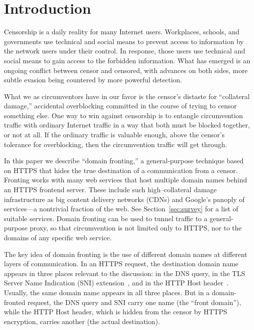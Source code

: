 \documentclass[conference]{IEEEtran}
\begin{document}
\section{Introduction}


Censorship is a daily reality for many Internet users.
Workplaces, schools, and governments use technical and social means
to prevent access to information by the network users under their control.
In response, those users use technical and social means
to gain access to the forbidden information.
What has emerged is an ongoing conflict between censor and censored,
with advances on both sides, more subtle evasion being countered by more powerful detection.

What we as circumventors have in our favor is the censor's
distaste for ``collateral damage,''
accidental overblocking committed in the course of trying to censor something else.
One way to win against censorship is to entangle circumvention traffic
with ordinary Internet traffic in a way that both must be blocked together,
or not at all.
If the ordinary traffic is valuable enough,
above the censor's tolerance for overblocking,
then the circumvention traffic will get through.

In this paper we describe ``domain fronting,'' a general-purpose technique
based on HTTPS that hides the true destination of a communication
from a censor.
Fronting works with many web services that host multiple domain names
behind an HTTPS frontend server.
These include such high--collateral damage infrastructure as
big content delivery networks (CDNs)
and Google's panoply of services---a nontrivial fraction of the web.
See Section~\ref{sec:survey} for a list of suitable services.
Domain fronting can be used to tunnel traffic
to a general-purpose proxy,
so that circumvention is not limited only to HTTPS, nor to the domains of any specific web service.

The key idea of domain fronting is the use of
different domain names at different layers of communication.
In an HTTPS request, the destination domain name appears
in three places relevant to the discussion:
in the DNS query,
in the TLS Server Name Indication (SNI) extension~\cite[Section~3]{rfc6066},
and in the HTTP Host header~\cite[Section~14.23]{rfc2616}.
Usually, the same domain name appears in all three places.
But in a domain-fronted request,
the DNS query and SNI carry one name (the ``front domain''),
while the HTTP Host header,
which is hidden from the censor by HTTPS encryption,
carries another (the actual destination).
\end{document}
